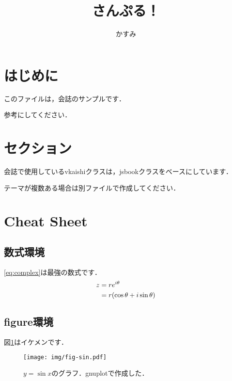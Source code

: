 \documentclass[uplatex,dvipdfmx]{vkaishi}
\begin{document}
\title{さんぷる！}%
\author[中須]{かすみ}%

\maketitle %



\section*{はじめに}
このファイルは，会誌のサンプルです．\par
参考にしてください．

\section{セクション}
会誌で使用しているvkaishiクラスは，jsbookクラスをベースにしています．\par
テーマが複数ある場合は別ファイルで作成してください．

\section{Cheat Sheet}

\subsection{数式環境}
\eqref{eq:complex}は最強の数式です．
\begin{align}
  z &= r e^{i\theta} \notag \\
    &= r (\cos\theta + i\sin\theta) \label{eq:complex}
\end{align}

\subsection{figure環境}
図\ref{fig:sin}はイケメンです．
\begin{figure}[htbp]
  \centering
  \texttt{[image: img/fig-sin.pdf]}
  \caption{$y=\sin x$のグラフ．gnuplotで作成した．}
  \label{fig:sin}
\end{figure}
\end{document}
